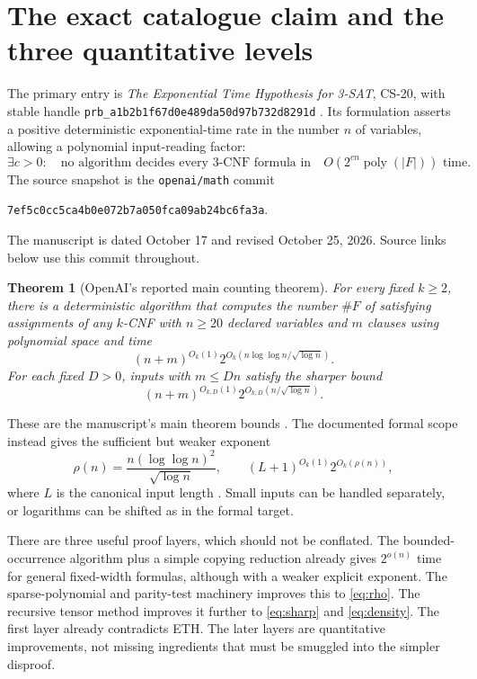\documentclass[11pt,a4paper]{article}
\numberwithin{equation}{section}
\newtheorem{theorem}{Theorem}[section]
\theoremstyle{definition}
\theoremstyle{remark}
\newcommand{\poly}{\operatorname{poly}}
\begin{document}
\section{The exact catalogue claim and the three quantitative levels}
\label{sec:target}
The primary entry is \emph{The Exponential Time Hypothesis for 3-SAT}, CS-20,
with stable handle
\texttt{prb\_a1b2b1f67d0e489da50d97b732d8291d} \cite{catalogue}.
Its formulation asserts a positive deterministic exponential-time rate in the
number $n$ of variables, allowing a polynomial input-reading factor:
\begin{equation}\label{eq:eth}
 \exists c>0:\quad\text{no algorithm decides every $3$-CNF formula in}
 \quad O(2^{cn}\poly(|F|))\text{ time}.
\end{equation}
The source snapshot is the \texttt{openai/math} commit
\begin{center}\texttt{7ef5c0cc5ca4b0e072b7a050fca09ab24bc6fa3a}.\end{center}
The manuscript is dated October 17 and revised October 25, 2026. Source links
below use this commit throughout.

\begin{theorem}[OpenAI's reported main counting theorem]\label{thm:main}
For every fixed $k\ge2$, there is a deterministic algorithm that computes the
number $\#F$ of satisfying assignments of any $k$-CNF with $n\ge20$ declared
variables and $m$ clauses using polynomial space and time
\begin{equation}\label{eq:sharp}
 (n+m)^{O_k(1)}
 2^{O_k(n\log\log n/\sqrt{\log n})}.
\end{equation}
For each fixed $D>0$, inputs with $m\le Dn$ satisfy the sharper bound
\begin{equation}\label{eq:density}
 (n+m)^{O_{k,D}(1)}2^{O_{k,D}(n/\sqrt{\log n})}.
\end{equation}
\end{theorem}
These are the manuscript's main theorem bounds \cite{paper,quant-reduction}.
The documented formal scope instead gives the sufficient but weaker exponent
\begin{equation}\label{eq:rho}
 \rho(n)=\frac{n(\log\log n)^2}{\sqrt{\log n}},\qquad
 (L+1)^{O_k(1)}2^{O_k(\rho(n))},
\end{equation}
where $L$ is the canonical input length \cite{scope}. Small inputs can be
handled separately, or logarithms can be shifted as in the formal target.

There are three useful proof layers, which should not be conflated. The
bounded-occurrence algorithm plus a simple copying reduction already gives
$2^{o(n)}$ time for general fixed-width formulas, although with a weaker
explicit exponent. The sparse-polynomial and parity-test machinery improves
this to \eqref{eq:rho}. The recursive tensor method improves it further to
\eqref{eq:sharp} and \eqref{eq:density}. The first layer already contradicts
ETH. The later layers are quantitative improvements, not missing ingredients
that must be smuggled into the simpler disproof.
\end{document}
